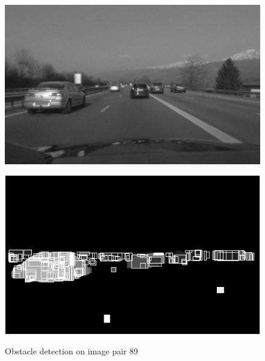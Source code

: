 \documentclass[a4paper,11pt]{article}
\begin{document}
\begin{figure}[H]
\centering
\begin{minipage}{0.45\linewidth}
\centering
\includegraphics[scale=0.3]{pic/left_89.png}
\label{clustering-alt:a}
\end{minipage}
\begin{minipage}{0.45\linewidth}
\centering
\includegraphics[scale=0.3]{pic/clustering-alt.png}
\label{clustering-alt:b}
\end{minipage}
\caption{Obstacle detection on image pair 89}
\label{clustering-alt}
\end{figure}
\end{document}
